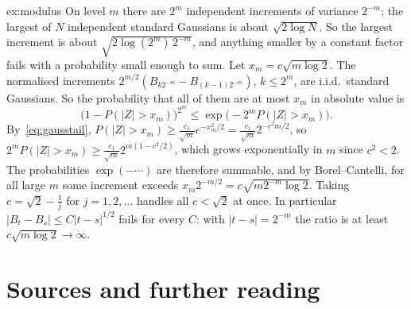 \begin{solution}{ex:modulus}
\idea On level $m$ there are $2^m$ independent increments of variance $2^{-m}$; the largest of $N$ independent standard Gaussians is about $\sqrt{2\log N}$. So the largest increment is
about $\sqrt{2\log(2^m)\,2^{-m}}$, and anything smaller by a constant factor fails with a probability small enough to sum.
\writeup Let $x_m=c\sqrt{m\log2}$. The normalised increments $2^{m/2}(B_{k2^{-m}}-B_{(k-1)2^{-m}})$, $k\le2^m$, are i.i.d.\ standard Gaussians. So the probability that all of them are at most
$x_m$ in absolute value is
\[
\bigl(1-P(|Z|>x_m)\bigr)^{2^m}\le\exp\bigl(-2^mP(|Z|>x_m)\bigr).
\]
By~\eqref{eq:gausstail}, $P(|Z|>x_m)\ge\frac{c_1}{\sqrt m}e^{-x_m^2/2}=\frac{c_1}{\sqrt m}2^{-c^2m/2}$, so $2^mP(|Z|>x_m)\ge\frac{c_1}{\sqrt m}2^{m(1-c^2/2)}$, which grows exponentially in
$m$ since $c^2<2$. The probabilities $\exp(-\cdots)$ are therefore summable, and by Borel--Cantelli, for all large $m$ some increment exceeds $x_m2^{-m/2}=c\sqrt{m2^{-m}\log2}$. Taking
$c=\sqrt2-\frac1j$ for $j=1,2,\dots$ handles all $c<\sqrt2$ at once. In particular $|B_t-B_s|\le C|t-s|^{1/2}$ fails for every $C$: with $|t-s|=2^{-m}$ the ratio is at least
$c\sqrt{m\log2}\to\infty$.
\end{solution}

\section*{Sources and further reading}

